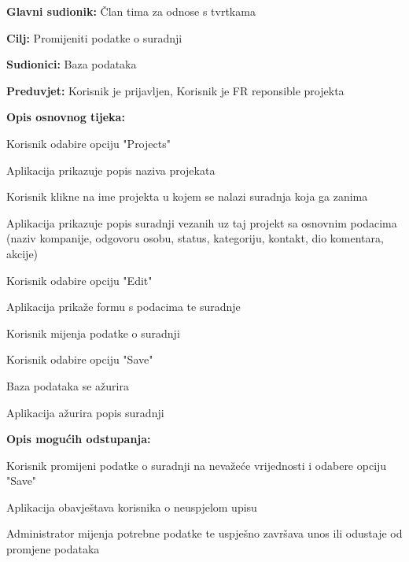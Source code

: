 					\noindent {}
					\begin{packed_item}

						\item \textbf{Glavni sudionik:} Član tima za odnose s tvrtkama
						\item \textbf{Cilj:} Promijeniti podatke o suradnji
						\item \textbf{Sudionici:} Baza podataka
						\item \textbf{Preduvjet:} Korisnik je prijavljen, Korisnik je FR reponsible projekta
						\item \textbf{Opis osnovnog tijeka:}

						\item[] \begin{packed_enum}

							\item Korisnik odabire opciju "Projects"
							\item Aplikacija prikazuje popis naziva projekata
							\item Korisnik klikne na ime projekta u kojem se nalazi suradnja koja ga zanima
							\item Aplikacija prikazuje popis suradnji vezanih uz taj projekt sa osnovnim podacima (naziv kompanije, odgovoru osobu, status, kategoriju, kontakt, dio komentara, akcije)
							\item Korisnik odabire opciju "Edit"
							\item Aplikacija prikaže formu s podacima te suradnje
							\item Korisnik mijenja podatke o suradnji
							\item Korisnik odabire opciju "Save"
							\item Baza podataka se ažurira
							\item Aplikacija ažurira popis suradnji

						\end{packed_enum}
						
						\item \textbf{Opis mogućih odstupanja:}

						\item[] \begin{packed_item}

							\item[1.9.b, 2.7.b] Korisnik promijeni podatke o suradnji na nevažeće vrijednosti
							i odabere opciju "Save"
							
							\item[] \begin{packed_enum}

								\item Aplikacija obavještava korisnika o neuspjelom upisu
								\item Administrator mijenja potrebne podatke te uspješno završava unos ili
								odustaje od promjene podataka

							\end{packed_enum}

						\end{packed_item}
						
					\end{packed_item}

